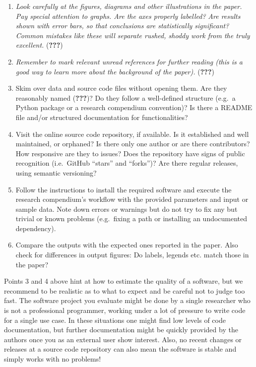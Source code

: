 \documentclass[twocolumn]{article}
\providecommand{\tightlist}{%
  \setlength{\itemsep}{0pt}\setlength{\parskip}{0pt}}
\begin{document}
\begin{enumerate}
\def\labelenumi{\arabic{enumi}.}
\tightlist
\item
  \emph{Look carefully at the figures, diagrams and other illustrations
  in the paper. Pay special attention to graphs. Are the axes properly
  labelled?} \emph{Are results shown with error bars, so that
  conclusions are statistically significant? Common mistakes like these
  will separate rushed, shoddy work from the truly excellent.}
  ({\textbf{???}})
\item
  \emph{Remember to mark relevant unread references for further reading
  (this is a good way to learn more about the background of the paper).}
  ({\textbf{???}})
\item
  Skim over data and source code files without opening them. Are they
  reasonably named ({\textbf{???}})? Do they follow a well-defined
  structure (e.g.~a Python package or a research compendium convention)?
  Is there a README file and/or structured documentation for
  functionalities?
\item
  Visit the online source code repository, if available. Is it
  established and well maintained, or orphaned? Is there only one author
  or are there contributors? How responsive are they to issues? Does the
  repository have signs of public recognition (i.e.~GitHub ``stars'' and
  ``forks'')? Are there regular releases, using semantic versioning?
\item
  Follow the instructions to install the required software and execute
  the research compendium's workflow with the provided parameters and
  input or sample data. Note down errors or warnings but do not try to
  fix any but trivial or known problems (e.g.~fixing a path or
  installing an undocumented dependency).
\item
  Compare the outputs with the expected ones reported in the paper. Also
  check for differences in output figures: Do labels, legends etc. match
  those in the paper?
\end{enumerate}

Points 3 and 4 above hint at how to estimate the quality of a software,
but we recommend to be realistic as to what to expect and be careful not
to judge too fast. The software project you evaluate might be done by a
single researcher who is not a professional programmer, working under a
lot of pressure to write code for a single use case. In these situations
one might find low levels of code documentation, but further
documentation might be quickly provided by the authors once you as an
external user show interest. Also, no recent changes or releases at a
source code repository can also mean the software is stable and simply
works with no problems!
\end{document}
